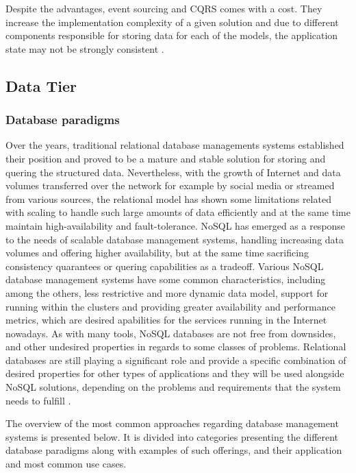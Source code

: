 Despite the advantages, event sourcing and CQRS comes with a cost. They increase the implementation complexity of a given solution and due to different components responsible for storing data for each of the models, the application state may not be strongly consistent \cite{MicroservicesArchitecture}.

\subsection{Data Tier}

\subsubsection{Database paradigms} \label{chapter:database-paradigms}

Over the years, traditional relational database managements systems established their position and proved to be a mature and stable solution for storing and quering the structured data. Nevertheless, with the growth of Internet and data volumes transferred over the network for example by social media or streamed from various sources, the relational model has shown some limitations related with scaling to handle such large amounts of data efficiently and at the same time maintain high-availability and fault-tolerance. NoSQL has emerged as a response to the needs of scalable database management systems, handling increasing data volumes and offering higher availability, but at the same time sacrificing consistency quarantees or quering capabilities as a tradeoff. Various NoSQL database management systems have some common characteristics, including among the others, less restrictive and more dynamic data model, support for running within the clusters and providing greater availability and performance metrics, which are desired apabilities for the services running in the Internet nowadays. As with many tools, NoSQL databases are not free from downsides, and other undesired properties in regards to some classes of problems. Relational databases are still playing a significant role and provide a specific combination of desired properties for other types of applications and they will be used alongside NoSQL solutions, depending on the problems and requirements that the system needs to fulfill \cite{FowlerNoSQL}.

The overview of the most common approaches regarding database management systems is presented below. It is divided into categories presenting the different database paradigms along with examples of such offerings, and their application and most common use cases.

